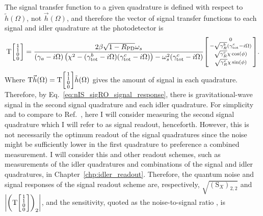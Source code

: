 The signal transfer function to a given quadrature is defined with respect to $\tilde h(\Omega)$, not $\vec h(\Omega)$, and therefore the vector of signal transfer functions to each signal and idler quadrature at the photodetector is
\begin{equation}\label{eq:nIS_sigRO_signal_response}
\text{T}\begin{bsmallmatrix}1 \\1\\0\\0\end{bsmallmatrix} = \frac{2 \beta \sqrt{1-R_\text{PD}} \omega_s}{(\gamma_a-i \Omega ) \left(\chi ^2-(\gamma^b_\text{tot}-i\Omega) (\gamma^c_\text{tot}-i\Omega)\right)-\omega_s^2 (\gamma^c_\text{tot}-i \Omega )} \begin{bsmallmatrix}0 \\-\sqrt{\gamma^b_R}(\gamma^c_\text{tot}-i\Omega)\\\sqrt{\gamma^c_R}\chi\cos(\phi)\\\sqrt{\gamma^c_R}\chi\sin(\phi)\end{bsmallmatrix}.
\end{equation}
Where $\text{T}\vec h(\Omega)=\text{T}\begin{bsmallmatrix}1 \\1\\0\\0\end{bsmallmatrix}\tilde h(\Omega)$ gives the amount of signal in each quadrature.
Therefore, by Eq.~\ref{eq:nIS_sigRO_signal_response}, there is gravitational-wave signal in the second signal quadrature and each idler quadrature. For simplicity and to compare to Ref.~\cite{Li2020}, here I will consider measuring the second signal quadrature which I will refer to as signal readout, henceforth. However, this is not necessarily the optimum readout of the signal quadratures since the noise might be sufficiently lower in the first quadrature to preference a combined measurement. I will consider this and other readout schemes, such as measurements of the idler quadratures and combinations of the signal and idler quadratures, in Chapter~\ref{chp:idler_readout}.
Therefore, the quantum noise and signal responses of the signal readout scheme are, respectively, $\sqrt{(\text{S}_X)_{2,2}}$ and $\abs{\left(\text{T}\begin{bsmallmatrix}1 \\1\\0\\0\end{bsmallmatrix}\right)_2}$, and the sensitivity, quoted as the noise-to-signal ratio , is
